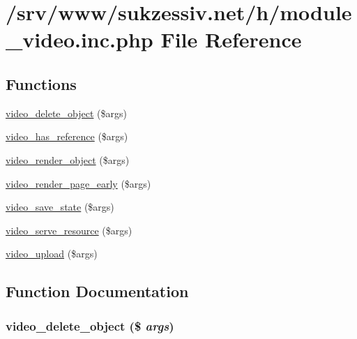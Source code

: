 \hypertarget{module__video_8inc_8php}{
\section{/srv/www/sukzessiv.net/h/module\_\-video.inc.php File Reference}
\label{module__video_8inc_8php}
}
\subsection*{Functions}
\begin{CompactItemize}
\item 
\hyperlink{module__video_8inc_8php_4d25a132251840ed2ade27b636a6694e}{video\_\-delete\_\-object} (\$args)
\item 
\hyperlink{module__video_8inc_8php_dbbede5e492ca7b9457deaf076c887b0}{video\_\-has\_\-reference} (\$args)
\item 
\hyperlink{module__video_8inc_8php_14d6bc200a41905ad201a24d9a2d9be5}{video\_\-render\_\-object} (\$args)
\item 
\hyperlink{module__video_8inc_8php_223ac9bac4acfb2c9b458b43e45e06e3}{video\_\-render\_\-page\_\-early} (\$args)
\item 
\hyperlink{module__video_8inc_8php_828b4f740b870b886936a22baf97418e}{video\_\-save\_\-state} (\$args)
\item 
\hyperlink{module__video_8inc_8php_5af838d3c4206bbc9bc3b5e57b16655c}{video\_\-serve\_\-resource} (\$args)
\item 
\hyperlink{module__video_8inc_8php_6ab50ffd184d8dcf84a9783dd6a2f80e}{video\_\-upload} (\$args)
\end{CompactItemize}


\subsection{Function Documentation}
\hypertarget{module__video_8inc_8php_4d25a132251840ed2ade27b636a6694e}{
\subsubsection[{video\_\-delete\_\-object}]{\setlength{\rightskip}{0pt plus 5cm}video\_\-delete\_\-object (\$ {\em args})}}
\label{module__video_8inc_8php_4d25a132251840ed2ade27b636a6694e}


